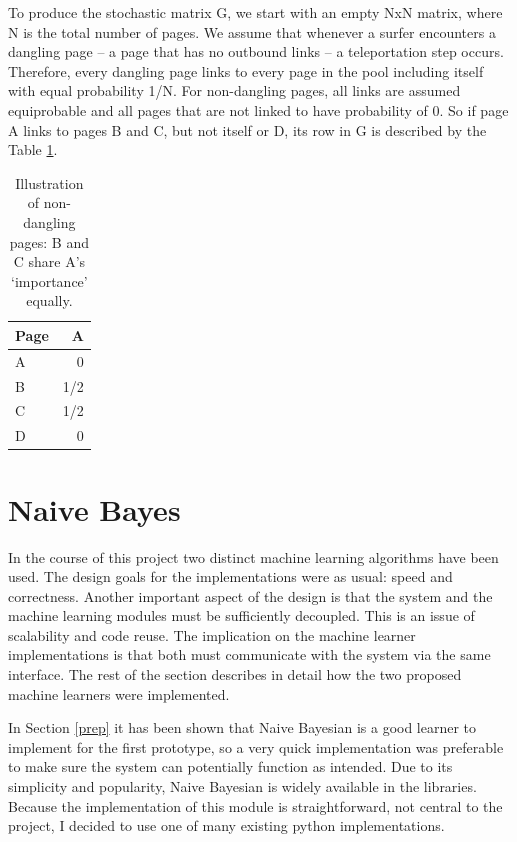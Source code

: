 \documentclass[12pt,notitlepage,twoside]{scrreprt}
\begin{document}
To produce the stochastic matrix G, we start with an empty NxN matrix, where N
is the total number of pages. We assume that whenever a surfer encounters a
dangling page -- a page that has no outbound links -- a teleportation step
occurs. Therefore, every dangling page links to every page in the pool
including itself with equal probability 1/N. For non-dangling pages, all links
are assumed equiprobable and all pages that are not linked to have probability
of 0. So if page A links to pages B and C, but not itself or D, its row in G is
described by the Table \ref{tab}.

\begin{table}
    \begin{center}
      \begin{tabular}{|l|r|}
        \hline
        Page & A \\ \hline
         A &  0  \\ \hline
         B & 1/2 \\ \hline
         C & 1/2 \\ \hline
         D & 0   \\ \hline
      \end{tabular}
      \caption{Illustration of non-dangling pages: B and C share A's `importance' equally.\label{tab}}
  \end{center}
\end{table}

\section{Naive Bayes}
In the course of this project two distinct machine learning algorithms have
been used. The design goals for the implementations were as usual: speed and
correctness. Another important aspect of the design is that the system and the
machine learning modules must be sufficiently decoupled. This is an issue of
scalability and code reuse. The implication on the machine learner
implementations is that both must communicate with the system via the same
interface. The rest of the section describes in detail how the two proposed
machine learners were implemented.

In Section \ref{prep} it has been shown that Naive Bayesian is a good learner
to implement for the first prototype, so a very quick implementation was
preferable to make sure the system can potentially function as intended. Due to
its simplicity and popularity, Naive Bayesian is widely available in the
libraries. Because the implementation of this module is straightforward, not
central to the project, I decided to use one of many existing python
implementations. 
\end{document}
